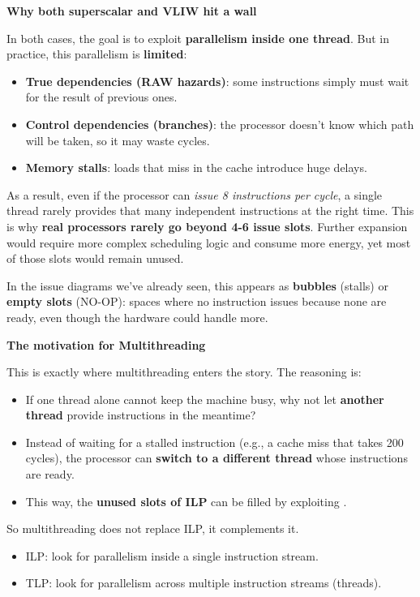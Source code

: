 \highspace
\begin{flushleft}
    \textcolor{Red2}{ \textbf{Why both superscalar and VLIW hit a wall}}
\end{flushleft}
In both cases, the goal is to exploit \textbf{parallelism inside one thread}. But in practice, this parallelism is \textbf{limited}:
\begin{itemize}
    \item \textbf{True dependencies (RAW hazards)}: some instructions simply must wait for the result of previous ones.
    \item \textbf{Control dependencies (branches)}: the processor doesn't know which path will be taken, so it may waste cycles.
    \item \textbf{Memory stalls}: loads that miss in the cache introduce huge delays.
\end{itemize}
As a result, even if the processor can \emph{issue 8 instructions per cycle}, a single thread rarely provides that many independent instructions at the right time. This is why \textbf{real processors rarely go beyond 4-6 issue slots}. Further expansion would require more complex scheduling logic and consume more energy, yet most of those slots would remain unused.

\highspace
In the issue diagrams we've already seen, this appears as \textbf{bubbles} (stalls) or \textbf{empty slots} (NO-OP): spaces where no instruction issues because none are ready, even though the hardware could handle more.

\highspace
\begin{flushleft}
    \textcolor{Green3}{ \textbf{The motivation for Multithreading}}
\end{flushleft}
This is exactly where multithreading enters the story. The reasoning is:
\begin{itemize}
    \item If one thread alone cannot keep the machine busy, why not let \textbf{another thread} provide instructions in the meantime?
    \item Instead of waiting for a stalled instruction (e.g., a cache miss that takes 200 cycles), the processor can \textbf{switch to a different thread} whose instructions are ready.
    \item This way, the \textbf{unused slots of ILP} can be filled by exploiting .
\end{itemize}
So multithreading does not replace ILP, it complements it.
\begin{itemize}
    \item ILP: look for parallelism inside a single instruction stream.
    \item TLP: look for parallelism across multiple instruction streams (threads).
\end{itemize}


